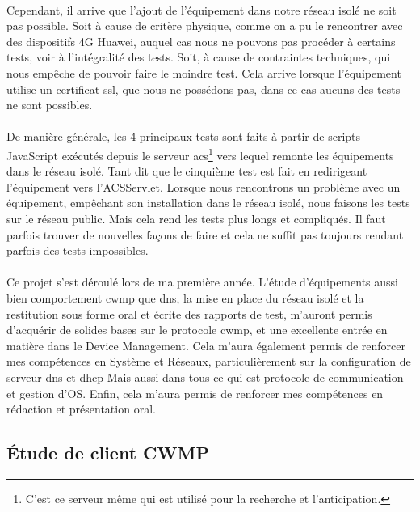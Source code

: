 \documentclass[12pt,a4paper]{report}
\begin{document}
\paragraph*{}Cependant, il arrive que l’ajout de l’équipement dans notre réseau isolé ne soit pas possible. Soit à cause de critère physique, comme on a pu le rencontrer avec des dispositifs 4G Huawei, auquel cas nous ne pouvons pas procéder à certains tests, voir à l’intégralité des tests. Soit, à cause de contraintes techniques, qui nous empêche de pouvoir faire le moindre test. Cela arrive lorsque l’équipement utilise un certificat \gls{ssl}, que nous ne possédons pas, dans ce cas aucuns des tests ne sont possibles.
\paragraph*{}De manière générale, les 4 principaux tests sont faits à partir de scripts JavaScript exécutés depuis le serveur \gls{acs}\footnote{C'est ce serveur même qui est utilisé pour la recherche et l'anticipation.} vers lequel remonte les équipements dans le réseau isolé. Tant dit que le cinquième test est fait en redirigeant l’équipement vers l’ACSServlet. Lorsque nous rencontrons un problème avec un équipement, empêchant son installation dans le réseau isolé, nous faisons les tests sur le réseau public. Mais cela rend les tests plus longs et compliqués. Il faut parfois trouver de nouvelles façons de faire et cela ne suffit pas toujours rendant parfois des tests impossibles. \\
\paragraph*{}Ce projet s'est déroulé lors de ma première année. L'étude d'équipements aussi bien comportement \gls{cwmp} que \gls{dns}, la mise en place du réseau isolé et la restitution sous forme oral et écrite des rapports de test, m'auront permis d'acquérir de solides bases sur le protocole \gls{cwmp}, et une excellente entrée en matière dans le Device Management. Cela m'aura également permis de renforcer mes compétences en Système et Réseaux, particulièrement sur la configuration de serveur \gls{dns} et \gls{dhcp} Mais aussi dans tous ce qui est protocole de communication et gestion d'OS. Enfin, cela m'aura permis de renforcer mes compétences en rédaction et présentation oral.\\
\subsection{Étude de client CWMP}
\end{document}
